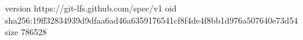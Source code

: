 version https://git-lfs.github.com/spec/v1
oid sha256:19ff32834939d9dfaa6ad46a6359176541cf8f4de4f8bb1d976a507640e73d54
size 786528
